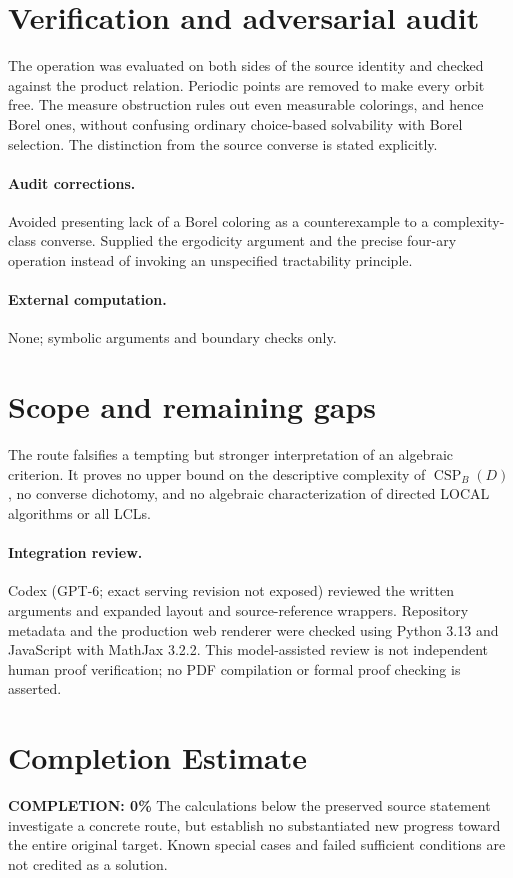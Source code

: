 \documentclass[11pt]{article}
\begin{document}
\section{Verification and adversarial audit}

The operation was evaluated on both sides of the source identity and checked
against the product relation. Periodic points are removed to make every orbit
free. The measure obstruction rules out even measurable colorings, and hence
Borel ones, without confusing ordinary choice-based solvability with Borel
selection. The distinction from the source converse is stated explicitly.

\paragraph{Audit corrections.} Avoided presenting lack of a Borel coloring as a counterexample to a
complexity-class converse. Supplied the ergodicity argument and the precise
four-ary operation instead of invoking an unspecified tractability principle.
\paragraph{External computation.} None; symbolic arguments and boundary checks only.
\section{Scope and remaining gaps}

The route falsifies a tempting but stronger interpretation of an algebraic
criterion. It proves no upper bound on the descriptive complexity of
$\operatorname{CSP}_B(D)$, no converse dichotomy, and no algebraic
characterization of directed LOCAL algorithms or all LCLs.

\paragraph{Integration review.} Codex (GPT-6; exact serving revision not exposed) reviewed the written arguments and expanded layout and source-reference wrappers. Repository metadata and the production web renderer were checked using Python 3.13 and JavaScript with MathJax 3.2.2. This model-assisted review is not independent human proof verification; no PDF compilation or formal proof checking is asserted.

\section{Completion Estimate}
\noindent\textbf{COMPLETION: 0\%}
The calculations below the preserved source statement investigate a concrete route,
but establish no substantiated new progress toward the entire original target.
Known special cases and failed sufficient conditions are not credited as a solution.
\end{document}
